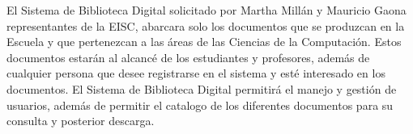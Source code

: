 El Sistema de Biblioteca Digital solicitado por Martha Millán  y Mauricio Gaona representantes de
la EISC, abarcara solo los documentos que se produzcan en la Escuela y que pertenezcan a las áreas
de las Ciencias de la Computación. Estos documentos estarán al alcancé de los estudiantes y
profesores, además de cualquier persona que desee registrarse en el sistema y esté interesado en
los documentos. 
El Sistema de Biblioteca Digital permitirá el manejo  y gestión de usuarios, además de permitir el
catalogo de los diferentes documentos para su consulta y posterior descarga.
